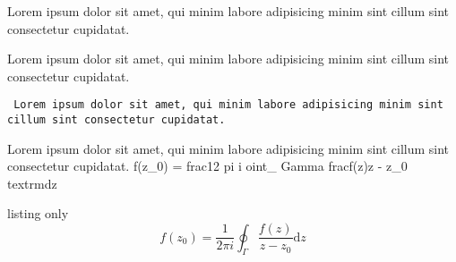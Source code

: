 
{
  Lorem ipsum dolor sit amet, qui minim labore adipisicing minim sint cillum sint consectetur cupidatat.
}

{
  \sffamily
  Lorem ipsum dolor sit amet, qui minim labore adipisicing minim sint cillum sint consectetur cupidatat.
}

{
  \tt 
  Lorem ipsum dolor sit amet, qui minim labore adipisicing minim sint cillum sint consectetur cupidatat.
}

{ 
  \terminal
  Lorem ipsum dolor sit amet, qui minim labore adipisicing minim sint cillum sint consectetur cupidatat.
  f(z\_0) = frac{1}{2 pi i} oint\_ Gamma frac{f(z)}{z - z\_0} textrm{d}z 
}

\begin{PresentationCode}[blue]{listing only}
\[
f(z_0) = \frac{1}{2\pi i} \oint_{\Gamma} \frac{f(z)}{z - z_0} \textrm{d}z
\]
\end{PresentationCode}

